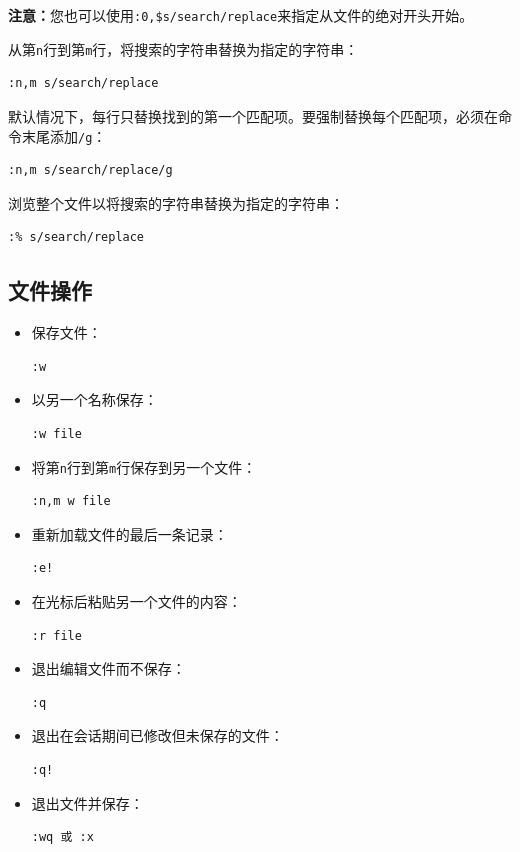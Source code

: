 \documentclass[12pt,a4paper,twoside]{ctexbook}
\begin{document}
\textbf{注意：}您也可以使用\texttt{:0,\$s/search/replace}来指定从文件的绝对开头开始。

从第\texttt{n}行到第\texttt{m}行，将搜索的字符串替换为指定的字符串：

\begin{verbatim}
:n,m s/search/replace
\end{verbatim}

默认情况下，每行只替换找到的第一个匹配项。要强制替换每个匹配项，必须在命令末尾添加\texttt{/g}：

\begin{verbatim}
:n,m s/search/replace/g
\end{verbatim}

浏览整个文件以将搜索的字符串替换为指定的字符串：

\begin{verbatim}
:% s/search/replace
\end{verbatim}

\subsection{文件操作}

\begin{itemize}
    \item 保存文件：
    \begin{verbatim}
:w
    \end{verbatim}
    
    \item 以另一个名称保存：
    \begin{verbatim}
:w file
    \end{verbatim}
    
    \item 将第\texttt{n}行到第\texttt{m}行保存到另一个文件：
    \begin{verbatim}
:n,m w file
    \end{verbatim}
    
    \item 重新加载文件的最后一条记录：
    \begin{verbatim}
:e!
    \end{verbatim}
    
    \item 在光标后粘贴另一个文件的内容：
    \begin{verbatim}
:r file
    \end{verbatim}
    
    \item 退出编辑文件而不保存：
    \begin{verbatim}
:q
    \end{verbatim}
    
    \item 退出在会话期间已修改但未保存的文件：
    \begin{verbatim}
:q!
    \end{verbatim}
    
    \item 退出文件并保存：
    \begin{verbatim}
:wq 或 :x
    \end{verbatim}
\end{itemize}
\end{document}
